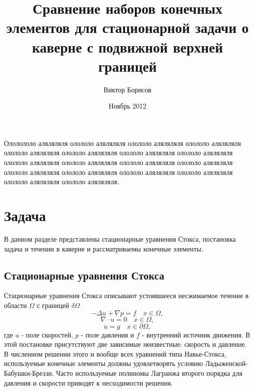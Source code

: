 \documentclass[12pt]{article}
\title{Сравнение наборов конечных элементов для стационарной задачи о каверне с подвижной верхней границей}
\date{Ноябрь 2012}
\author{Виктор Борисов}
\begin{document}
\maketitle

Ололололо аляляляля олололо аляляляля олололо аляляляля олололо аляляляля олололо аляляляля олололо аляляляля олололо аляляляля олололо аляляляля олололо аляляляля олололо аляляляля олололо аляляляля олололо аляляляля олололо аляляляля олололо аляляляля олололо аляляляля олололо аляляляля олололо аляляляля олололо аляляляля.

\section{Задача}
В данном разделе представлены стационарные уравнения Стокса, 
постановка задача и течении в каверне и рассматриваемы конечные элементы.
\subsection{Стационарные уравнения Стокса}
Стационарные уравнения Стокса описывают устоявшееся несжимаемое течение в области $\Omega$ с границей $\delta\Omega$
\begin{equation}
-\Delta u + \nabla p = f \quad x \in \Omega,
\end{equation}
\begin{equation}
\nabla\cdot u = 0 \quad x \in \Omega,
\end{equation}
\begin{equation}
u = g \quad x \in \partial\Omega,
\end{equation}
где $u$ - поле скоростей, $p$ - поле давления и $f$ - внутренний источник движения.
В этой постановке присутствуют две зависимые неизвестные: скорость и давление.
В численном решении этого и вообще всех уравнений типа Навье-Стокса, используемые конечные элементы должны удовлетворять условию Ладыженской-Бабушки-Бреззи. Часто используемые полиномы Лагранжа второго порядка для давления и скорости приводят к несходимости решения.
\end{document}
